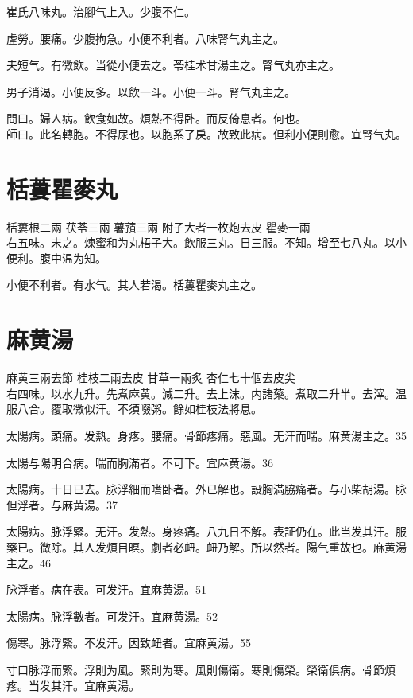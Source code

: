 崔氏八味丸。治腳气上入。少腹不仁。

虗勞。腰痛。少腹拘急。小便不利者。八味腎气丸主之。

夫短气。有微飲。当從小便去之。苓桂术甘湯主之。腎气丸亦主之。

男子消渴。小便反多。以飲一斗。小便一斗。腎气丸主之。

問曰。婦人病。飲食如故。煩熱不得卧。而反倚息者。何也。\\
師曰。此名轉胞。不得尿也。以胞系了戾。故致此病。但利小便則愈。宜腎气丸。

\section{栝蔞瞿麥丸}

栝蔞根{\scriptsize 二兩} 茯苓{\scriptsize 三兩} 薯蕷{\scriptsize 三兩} 附子{\scriptsize 大者一枚炮去皮} 瞿麥{\scriptsize 一兩}\\
右五味。末之。煉蜜和为丸梧子大。飲服三丸。日三服。不知。增至七八丸。以小便利。腹中温为知。

小便不利者。有水气。其人若渴。栝蔞瞿麥丸主之。

\section{麻黄湯}

麻黄{\scriptsize 三兩去節} 桂枝{\scriptsize 二兩去皮} 甘草{\scriptsize 一兩炙} 杏仁{\scriptsize 七十個去皮尖}\\
右四味。以水九升。先煮麻黄。減二升。去上沫。内諸藥。煮取二升半。去滓。温服八合。覆取微似汗。不須啜粥。餘如桂枝法將息。

太陽病。頭痛。发熱。身疼。腰痛。骨節疼痛。惡風。无汗而喘。麻黄湯主之。35

太陽与陽明合病。喘而胸滿者。不可下。宜麻黄湯。36

太陽病。十日已去。脉浮細而嗜卧者。外已解也。設胸滿脇痛者。与小柴胡湯。脉{\khaaitp 但}浮者。与麻黄湯。37

太陽病。脉浮緊。无汗。发熱。身疼痛。八九日不解。表証仍在。此当发其汗。服藥已。微除。其人发煩目暝。劇者必衄。衄乃解。所以然者。陽气重故也。麻黄湯主之。46

脉浮者。病在表。可发汗。宜麻黄湯。51

{\khaaitp 太陽病。}脉浮數者。可发汗。宜麻黄湯。52

傷寒。脉浮緊。不发汗。因致衄者。宜麻黄湯。55

{\khaaitp 寸口}脉浮而緊。浮則为風。緊則为寒。風則傷衛。寒則傷榮。榮衛俱病。骨節煩疼。当发其汗。{\khaaitp 宜麻黄湯。}


